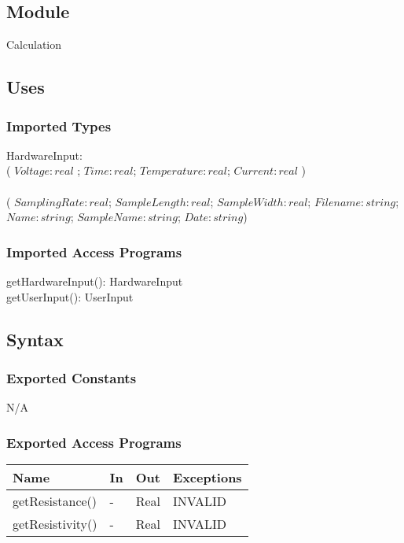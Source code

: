 \documentclass[12pt, titlepage]{article}
\begin{document}
\subsection{Module}

Calculation

\subsection{Uses}

\subsubsection{Imported Types}
HardwareInput: \\
( $Voltage: real $ ; $Time: real$; $Temperature: real$; $Current: real$ )\\

 \\
( $SamplingRate: real$; $SampleLength: real$; $SampleWidth: real$; $Filename: string$; $Name: string$; $SampleName: string$; $Date: string$)

\subsubsection{Imported Access Programs}
getHardwareInput(): HardwareInput \\
getUserInput(): UserInput

\subsection{Syntax}

\subsubsection{Exported Constants}
N/A

\subsubsection{Exported Access Programs}

\begin{center}
\begin{tabular}{p{4cm} p{2cm} p{4cm} p{2cm}}
\hline
\textbf{Name} & \textbf{In} & \textbf{Out} & \textbf{Exceptions} \\
\hline
getResistance() & - & Real & INVALID \\
getResistivity() & - & Real & INVALID \\
\hline
\end{tabular}
\end{center}
\end{document}
